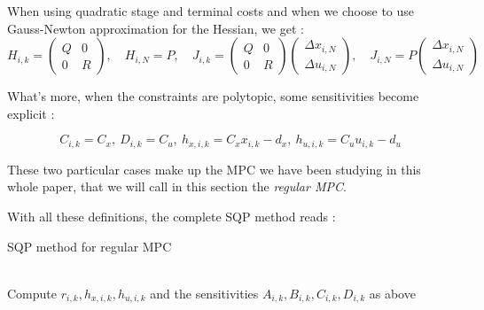 \documentclass[12pt]{article}
\begin{document}
When using quadratic stage and terminal costs and when we choose to use Gauss-Newton approximation for the Hessian, we get :
\begin{equation*}
	H_{i,k}=\begin{pmatrix}Q&0\\0&R\end{pmatrix},\quad H_{i,N}=P,\quad J_{i,k}=\begin{pmatrix}Q&0\\0&R\end{pmatrix}\begin{pmatrix}\Delta x_{i,N}\\\Delta u_{i,N}\end{pmatrix},\quad J_{i,N}=P\begin{pmatrix}\Delta x_{i,N}\\\Delta u_{i,N}\end{pmatrix}
\end{equation*}

\noindent What's more, when the constraints are polytopic, some sensitivities become explicit :

\begin{equation*}
	C_{i,k}=C_x,~D_{i,k}=C_u,~h_{x,i,k}=C_xx_{i,k}-d_x,~h_{u,i,k}=C_uu_{i,k}-d_u
\end{equation*}

These two particular cases make up the MPC we have been studying in this whole paper, that we will call in this section the \textit{regular MPC}.


\noindent With all these definitions, the complete SQP method reads :

\begin{algorithm}[H]
	\caption{SQP method for regular MPC}
	\label{algo:SQP-reg}
	\begin{algorithmic}[1]
	 
	 
	\\
		\qquad \quad Compute $r_{i,k}, h_{x,i,k}, h_{u,i,k}$ and the sensitivities $A_{i,k}, B_{i,k}, C_{i,k}, D_{i,k}$ as above
		 
	\EndWhile
	\EndProcedure
	\end{algorithmic}
\end{algorithm}
\end{document}
